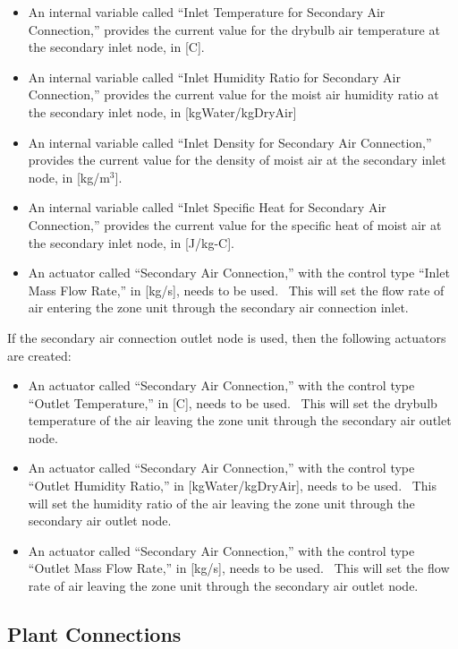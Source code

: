 \begin{itemize}
\item
  An internal variable called ``Inlet Temperature for Secondary Air Connection,'' provides the current value for the drybulb air temperature at the secondary inlet node, in {[}C{]}.
\item
  An internal variable called ``Inlet Humidity Ratio for Secondary Air Connection,'' provides the current value for the moist air humidity ratio at the secondary inlet node, in {[}kgWater/kgDryAir{]}
\item
  An internal variable called ``Inlet Density for Secondary Air Connection,'' provides the current value for the density of moist air at the secondary inlet node, in {[}kg/m\(^{3}\){]}.
\item
  An internal variable called ``Inlet Specific Heat for Secondary Air Connection,'' provides the current value for the specific heat of moist air at the secondary inlet node, in {[}J/kg-C{]}.
\item
  An actuator called ``Secondary Air Connection,'' with the control type ``Inlet Mass Flow Rate,'' in {[}kg/s{]}, needs to be used.~ This will set the flow rate of air entering the zone unit through the secondary air connection inlet.
\end{itemize}

If the secondary air connection outlet node is used, then the following actuators are created:

\begin{itemize}
\item
  An actuator called ``Secondary Air Connection,'' with the control type ``Outlet Temperature,'' in {[}C{]}, needs to be used.~ This will set the drybulb temperature of the air leaving the zone unit through the secondary air outlet node.
\item
  An actuator called ``Secondary Air Connection,'' with the control type ``Outlet Humidity Ratio,'' in {[}kgWater/kgDryAir{]}, needs to be used.~ This will set the humidity ratio of the air leaving the zone unit through the secondary air outlet node.
\item
  An actuator called ``Secondary Air Connection,'' with the control type ``Outlet Mass Flow Rate,'' in {[}kg/s{]}, needs to be used.~ This will set the flow rate of air leaving the zone unit through the secondary air outlet node.
\end{itemize}

\subsection{Plant Connections}\label{plant-connections-002}

